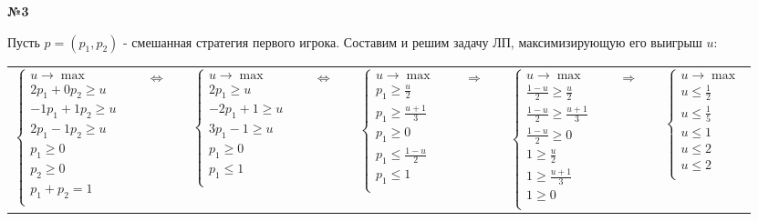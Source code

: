 \documentclass{article}
\newenvironment{task}{\begin{center}\fontsize{14}{14}\selectfont\bf}{\rm\fontsize{12}{12}\selectfont\end{center}}
\newcommand{\impl}{\quad \Leftrightarrow \quad}
\newcommand{\rimpl}{\quad \Rightarrow \quad}
\begin{document}
	\begin{task} 
		№3
	\end{task}
	Пусть $p = (p_1, p_2)$ - смешанная стратегия первого игрока. Составим и решим задачу ЛП, максимизирующую его выигрыш $u$:
	\begin{center}
		\begin{tabular}{ccccccccc}
			$\begin{cases}
			u \rightarrow \max \\
			2p_1 + 0p_2 \geq u \\
			-1p_1 +1p_2  \geq u \\
			2p_1 - 1p_2 \geq u \\
			p_1 \geq 0 \\
			p_2 \geq 0 \\
			p_1 + p_2 = 1 \\
			\end{cases}$ 
			& $\impl$ &
			$\begin{cases}
			u \rightarrow \max \\
			2p_1 \geq u \\
			-2p_1 + 1  \geq u \\
			3p_1 - 1 \geq u \\
			p_1 \geq 0 \\
			p_1 \leq 1 \\
			\end{cases}$ 
			& $\impl$ &
			$\begin{cases}
			u \rightarrow \max \\
			p_1 \geq \frac{u}{2} \\
			p_1 \geq \frac{u+1}{3} \\
			p_1 \geq 0 \\
			p_1  \leq \frac{1-u}{2} \\
			p_1 \leq 1 \\
			\end{cases}$ 
			& $\rimpl$ &
			$\begin{cases}
			u \rightarrow \max \\
			\frac{1-u}{2} \geq \frac{u}{2} \\
			\frac{1-u}{2} \geq \frac{u+1}{3} \\
			\frac{1-u}{2} \geq 0 \\
			
			1 \geq \frac{u}{2} \\
			1 \geq \frac{u+1}{3} \\
			1 \geq 0 \\
			\end{cases}$ 
			& $\rimpl$ &
			$\begin{cases}
			u \rightarrow \max \\
			u \leq \frac{1}{2} \\
			u \leq \frac{1}{5} \\
			u \leq 1 \\
			
			u \leq 2 \\
			u \leq 2 \\
			\end{cases}$ 
		\end{tabular}
	\end{center}
\end{document}
